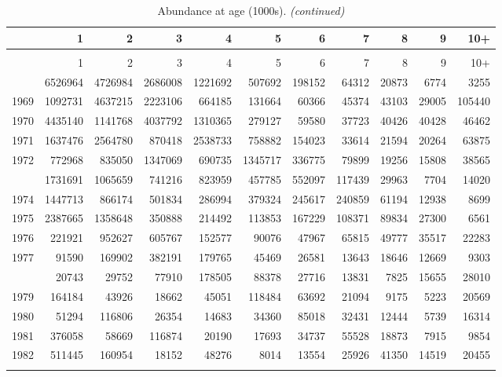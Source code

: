\documentclass[
]{article}
\begin{document}
\begin{longtable}[t]{lrrrrrrrrrr}
\caption{\label{tab:NAA-table}Abundance at age (1000s).}\\
\toprule
  & 1 & 2 & 3 & 4 & 5 & 6 & 7 & 8 & 9 & 10+\\
\midrule
\endfirsthead
\caption[]{Abundance at age (1000s). \textit{(continued)}}\\
\toprule
  & 1 & 2 & 3 & 4 & 5 & 6 & 7 & 8 & 9 & 10+\\
\midrule
\endhead

\endfoot
\bottomrule
\endlastfoot
1968 & 6526964 & 4726984 & 2686008 & 1221692 & 507692 & 198152 & 64312 & 20873 & 6774 & 3255\\
1969 & 1092731 & 4637215 & 2223106 & 664185 & 131664 & 60366 & 45374 & 43103 & 29005 & 105440\\
1970 & 4435140 & 1141768 & 4037792 & 1310365 & 279127 & 59580 & 37723 & 40426 & 40428 & 46462\\
1971 & 1637476 & 2564780 & 870418 & 2538733 & 758882 & 154023 & 33614 & 21594 & 20264 & 63875\\
1972 & 772968 & 835050 & 1347069 & 690735 & 1345717 & 336775 & 79899 & 19256 & 15808 & 38565\\
\addlinespace
1973 & 1731691 & 1065659 & 741216 & 823959 & 457785 & 552097 & 117439 & 29963 & 7704 & 14020\\
1974 & 1447713 & 866174 & 501834 & 286994 & 379324 & 245617 & 240859 & 61194 & 12938 & 8699\\
1975 & 2387665 & 1358648 & 350888 & 214492 & 113853 & 167229 & 108371 & 89834 & 27300 & 6561\\
1976 & 221921 & 952627 & 605767 & 152577 & 90076 & 47967 & 65815 & 49777 & 35517 & 22283\\
1977 & 91590 & 169902 & 382191 & 179765 & 45469 & 26581 & 13643 & 18646 & 12669 & 9303\\
\addlinespace
1978 & 20743 & 29752 & 77910 & 178505 & 88378 & 27716 & 13831 & 7825 & 15655 & 28010\\
1979 & 164184 & 43926 & 18662 & 45051 & 118484 & 63692 & 21094 & 9175 & 5223 & 20569\\
1980 & 51294 & 116806 & 26354 & 14683 & 34360 & 85018 & 32431 & 12444 & 5739 & 16314\\
1981 & 376058 & 58669 & 116874 & 20190 & 17693 & 34737 & 55528 & 18873 & 7915 & 9854\\
1982 & 511445 & 160954 & 18152 & 48276 & 8014 & 13554 & 25926 & 41350 & 14519 & 20455\\
\addlinespace

\end{longtable}
\end{document}
